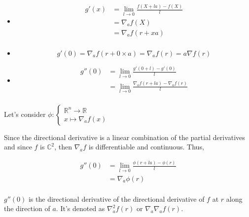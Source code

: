 \documentclass[12pt]{article}
\begin{document}
\begin{itemize}

\item
    \begin{equation*}
        \begin{split}
            g'(x) &= \lim_{l \rightarrow 0} \frac{f(X+la)-f(X)}{l} \\
            &=  \nabla_{a} f(X) \\
            &=  \nabla_{a} f(r+xa) \\
        \end{split}
    \end{equation*}
    
\item
    $$
    g'(0) = \nabla_{a} f(r+0 \times a) =  \nabla_{a} f(r) = a \nabla f(r)
    $$

\item

    \begin{equation*}
        \begin{split}
            g''(0) &= \lim_{l \rightarrow 0} \frac{g'(0+l)-g'(0)}{l} \\
            &= \lim_{l \rightarrow 0} \frac{\nabla_{a} f(r+la)-\nabla_{a} f(r)}{l} \\
        \end{split}
    \end{equation*}

\end{itemize}

Let's consider 
$
\phi : \begin{cases}
\mathbb{R}^n \rightarrow \mathbb{R} \\
x \mapsto \nabla_{a} f(x)
\end{cases}
$

Since the directional derivative is a linear combination of the partial derivatives and since $f$ is $\mathbb{C}^2$, then $\nabla_{a} f$ is differentiable and continuous. Thus, 

\begin{equation*}
    \begin{split}
    g''(0) &= \lim_{l \rightarrow 0} \frac{\phi(r+la)-\phi(r)}{l} \\
    &= \nabla_{a} \phi(r) \\
    \end{split}
\end{equation*}

$g''(0)$ is the directional derivative of the directional derivative of $f$ at $r$ along the direction of $a$. It's denoted as $\nabla_{a}^2 f(r)$ or $\nabla_{a} \nabla_{a} f(r)$.
\end{document}
